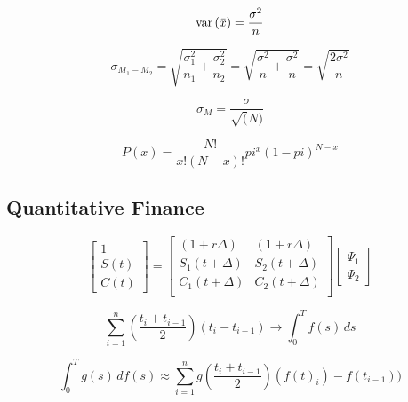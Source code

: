 \documentclass{article}
\begin{document}
\begin{equation}
{\mathop{\rm var}} \left( {\bar x} \right) = \frac{{\sigma ^2 }}{n}
\end{equation}

\begin{equation}
	\sigma_{M_{1}-M_{2}} =  \sqrt{\frac{\sigma_{1}^{2}}{n_{1}}+
	\frac{\sigma_{2}^{2}}{n_{2}}}=\sqrt{\frac{\sigma^2}{n}+
	\frac{\sigma^2}{n}}=\sqrt{\frac{2 \sigma^2}{n}}
\end{equation}

\begin{equation}
\sigma_{M} = \frac{\sigma}{\sqrt(N)}
\end{equation}

\begin{equation}
P(x)= \frac{N!}{x!(N-x)!} pi^{x}(1-pi)^{N-x} 
\end{equation}


\newpage

\subsection{Quantitative Finance} 

\begin{equation}
\begin{bmatrix} 1 \\ S \left( t \right) \\ C \left( t \right) \end{bmatrix} = \begin{bmatrix} \left( 1 + r \Delta \right) & \left( 1 + r \Delta \right) \\ S_1 \left( t + \Delta \right) & S_2 \left( t + \Delta \right) \\ C_1 \left( t + \Delta \right) & C_2 \left( t + \Delta \right) \\ \end{bmatrix}\begin{bmatrix} \Psi_1 \\ \Psi_2\end{bmatrix}
\end{equation}

\begin{equation}
\sum_{i=1}^{n} \left( \frac {t_i + t_{i-1}}{2} \right) (t_i-t_{i-1}) \rightarrow \int_{0}^{T}f(s)\,ds
\end{equation}

\begin{equation}
\int_{0}^{T} g(s)\,df(s) \approx \sum_{i=1}^{n} g \left( \frac{t_i+t_{i-1}}{2} \right) (f(t)_i)-f(t_{i-1}))
\end{equation}
\end{document}

